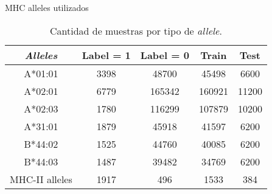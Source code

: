 \documentclass[10pt]{beamer}
\newcommand{\1}{
	\setbeamertemplate{background}{
		\texttt{[image: img/1]}
		\tikz[overlay] \fill[fill opacity=0.75,fill=white] (0,0) rectangle (-\paperwidth,\paperheight);
	}
}
\begin{document}
\begin{frame}{MHC alleles utilizados}{}
	\begin{table}[h]
		\centering
		\caption{Cantidad de muestras por tipo de \textit{allele}.}
		\label{tab:db}
		\setlength{\tabcolsep}{0.8em} %
		{\renewcommand{\arraystretch}{1.3}%
			\begin{tabular}{ccccc}
				\hline
				\textit{\textbf{Alleles}} & \textbf{Label = 1} & \textbf{Label = 0} & \textbf{Train}  & \textbf{Test}  \\ \hline
				A*01:01                   & 3398               & 48700              & 45498  & 6600  \\ 
				A*02:01                   & 6779               & 165342             & 160921 & 11200 \\ 
				A*02:03                   & 1780               & 116299             & 107879 & 10200 \\ 
				A*31:01                   & 1879               & 45918              & 41597  & 6200  \\ 
				B*44:02                   & 1525               & 44760              & 40085  & 6200  \\ 
				B*44:03                   & 1487               & 39482              & 34769  & 6200  \\ 
				MHC-II alleles            & 1917               & 496                & 1533  & 384  \\ 
			\end{tabular}
		}
	\end{table}
\end{frame}
\end{document}
